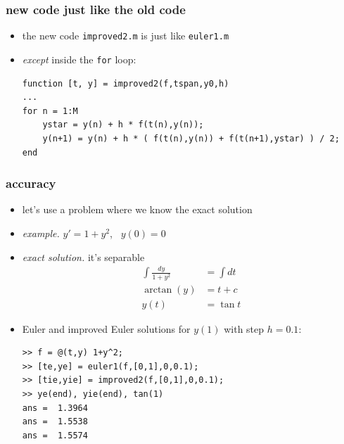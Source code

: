\documentclass[urlcolor=blue,dvipsnames]{beamer}
\begin{document}
\begin{frame}[fragile]
\frametitle{new code just like the old code}

\begin{itemize}
\item the new code \texttt{improved2.m} is just like \texttt{euler1.m}
\item \emph{except} inside the \texttt{for} loop:

\bigskip
{\color{Green}
\begin{Verbatim}[fontsize=\footnotesize]
function [t, y] = improved2(f,tspan,y0,h)
...
for n = 1:M
    ystar = y(n) + h * f(t(n),y(n));
    y(n+1) = y(n) + h * ( f(t(n),y(n)) + f(t(n+1),ystar) ) / 2;
end
\end{Verbatim}
}
\end{itemize}
\end{frame}


\begin{frame}[fragile]
\frametitle{accuracy}

\begin{itemize}
\item let's use a problem where we know the exact solution
\item \emph{example.}  $y' = 1+y^2$, \, $y(0)=0$
\item \emph{exact solution.} it's separable
\footnotesize
\begin{align*}
\int \frac{dy}{1+y^2} &= \int dt \\
\arctan(y) &= t+c \\
y(t) &= \tan t
\end{align*}
\normalsize
\item Euler and improved Euler solutions for $y(1)$ with step $h=0.1$:
\begin{Verbatim}[fontsize=\small]
>> f = @(t,y) 1+y^2;
>> [te,ye] = euler1(f,[0,1],0,0.1);
>> [tie,yie] = improved2(f,[0,1],0,0.1);
>> ye(end), yie(end), tan(1)
ans =  1.3964
ans =  1.5538
ans =  1.5574
\end{Verbatim}
\end{itemize}
\end{frame}
\end{document}
